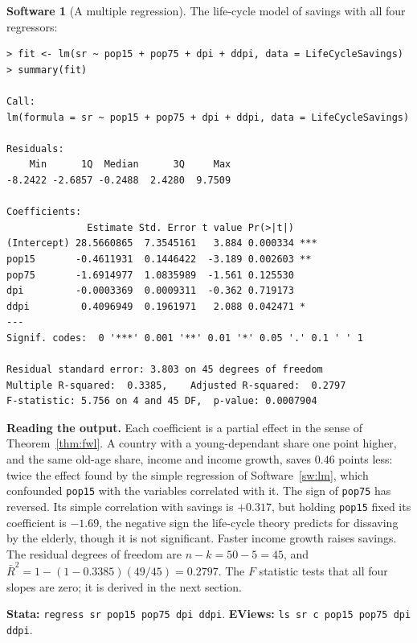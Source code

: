 \documentclass[11pt,a4paper]{article}
\numberwithin{equation}{section}
\theoremstyle{definition}
\newtheorem{software}[thm]{Software}
\begin{document}
\begin{software}[A multiple regression]
\label{sw:lmk}
The life-cycle model of savings with all four regressors:
{\small\begin{verbatim}
> fit <- lm(sr ~ pop15 + pop75 + dpi + ddpi, data = LifeCycleSavings)
> summary(fit)

Call:
lm(formula = sr ~ pop15 + pop75 + dpi + ddpi, data = LifeCycleSavings)

Residuals:
    Min      1Q  Median      3Q     Max
-8.2422 -2.6857 -0.2488  2.4280  9.7509

Coefficients:
              Estimate Std. Error t value Pr(>|t|)
(Intercept) 28.5660865  7.3545161   3.884 0.000334 ***
pop15       -0.4611931  0.1446422  -3.189 0.002603 **
pop75       -1.6914977  1.0835989  -1.561 0.125530
dpi         -0.0003369  0.0009311  -0.362 0.719173
ddpi         0.4096949  0.1961971   2.088 0.042471 *
---
Signif. codes:  0 '***' 0.001 '**' 0.01 '*' 0.05 '.' 0.1 ' ' 1

Residual standard error: 3.803 on 45 degrees of freedom
Multiple R-squared:  0.3385,    Adjusted R-squared:  0.2797
F-statistic: 5.756 on 4 and 45 DF,  p-value: 0.0007904
\end{verbatim}}
\textbf{Reading the output.} Each coefficient is a partial effect in the sense of Theorem~\ref{thm:fwl}. A country with a young-dependant share one point
higher, and the same old-age share, income and income growth, saves $0.46$ points less: twice the effect found by the simple regression of
Software~\ref{sw:lm}, which confounded \texttt{pop15} with the variables correlated with it. The sign of \texttt{pop75} has reversed. Its simple
correlation with savings is $+0.317$, but holding \texttt{pop15} fixed its coefficient is $-1.69$, the negative sign the life-cycle theory predicts
for dissaving by the elderly, though it is not significant. Faster income growth raises savings. The residual degrees of freedom are
$n - k = 50 - 5 = 45$, and $\bar R^2 = 1 - (1 - 0.3385)(49/45) = 0.2797$. The $F$ statistic tests that all four slopes are zero; it is derived in the next
section.

\textbf{Stata:} \texttt{regress sr pop15 pop75 dpi ddpi}. \textbf{EViews:} \texttt{ls sr c pop15 pop75 dpi ddpi}.
\end{software}
\end{document}
